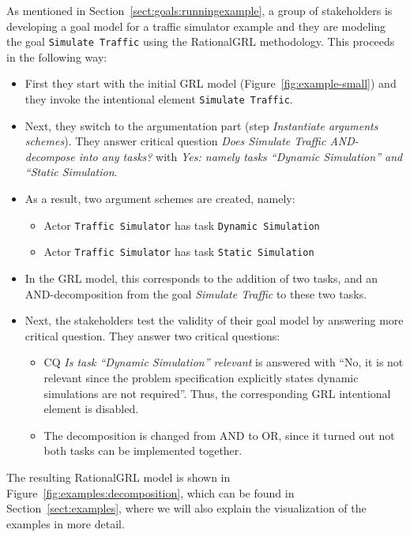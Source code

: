 As mentioned in Section~\ref{sect:goals:runningexample}, a group of stakeholders is developing a goal model for a traffic simulator example and they are modeling the goal \texttt{Simulate Traffic} using the RationalGRL methodology. This proceeds in the following way:
\begin{itemize}
\item
First they start %
with the initial GRL model (Figure~\ref{fig:example-small})  and they invoke the intentional element \texttt{Simulate Traffic}. %
\item Next, they switch to the argumentation part (step \emph{Instantiate arguments schemes}). They answer critical question \emph{Does Simulate Traffic AND-decompose into any tasks?} with \emph{Yes: namely tasks ``Dynamic Simulation'' and ``Static Simulation}.
\item As a result, two argument schemes are created, namely:
\begin{itemize}
\item Actor \texttt{Traffic Simulator} has task \texttt{Dynamic Simulation}
\item Actor \texttt{Traffic Simulator} has task \texttt{Static Simulation}
\end{itemize}
\item In the GRL model, this corresponds to the addition of two tasks, and an AND-decomposition from the goal \emph{Simulate Traffic} to these two tasks.
\item Next, the stakeholders test the validity of their goal model by answering more critical question. They answer two critical questions:
\begin{itemize}
\item
CQ \emph{Is task ``Dynamic Simulation'' relevant} is answered with ``No, it is not relevant since the problem specification explicitly states dynamic simulations are not required''. Thus, the corresponding GRL intentional element is disabled.
\item The decomposition is changed from AND to OR, since it turned out not both tasks can be implemented together.
\end{itemize}
\end{itemize}

The resulting RationalGRL model is shown in Figure~\ref{fig:examples:decomposition}, which can be found in Section~\ref{sect:examples}, where we will also explain the visualization of the examples in more detail.


